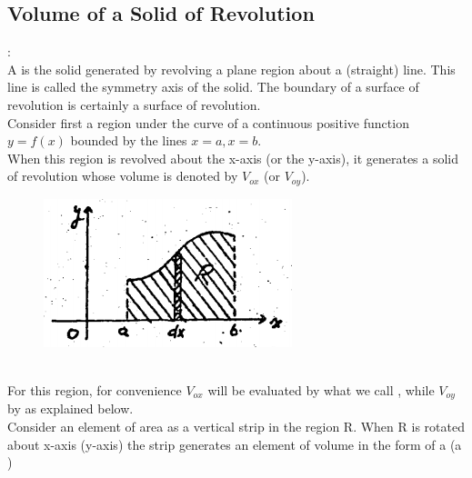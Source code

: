 \documentclass[11pt]{amsbook}
\begin{document}

\subsection{Volume of a Solid of Revolution}:
\label{subsec:VolumeofaSolidofRevolution}
\\
A  is the solid generated by revolving a plane region about a (straight) line. This line is called the symmetry axis of the solid. The boundary of a surface of revolution is certainly a surface of revolution.
\\
Consider first a region under the curve of a continuous positive function \(y=f(x)\) bounded by the lines \(x=a, x=b.\)
\\
When this region is revolved about the x-axis (or the y-axis), it generates a solid of revolution whose volume is denoted by \(V_{ox}\) (or \(V_{oy}\)).
\begin{figure}[htb]
	\centering
    \includegraphics[width=.4\textwidth]{images/b1p2-482-fig01}
\end{figure}
\\
For this region, for convenience \(V_{ox}\) will be evaluated by what we call , while \(V_{oy}\) by  as explained below.
\\
Consider an element of area as a vertical strip in the region R. When R is rotated about x-axis (y-axis) the strip generates an element of volume in the form of a  (a )
\end{document}
